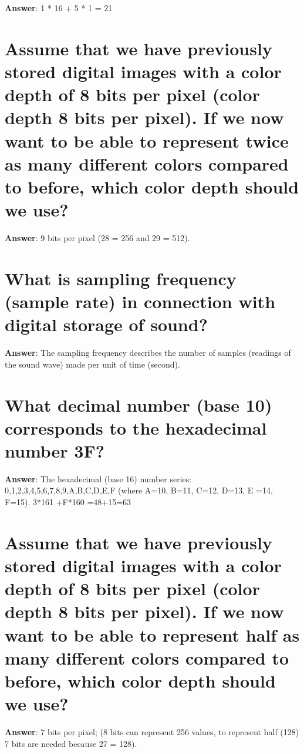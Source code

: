 \documentclass[a4paper,11pt,oneside]{book}
\begin{document}
\begin{sloppypar}
\textbf{Answer}: 1 * 16 + 5 * 1 = 21



\section{Assume that we have previously stored digital images with a color depth of 8 bits per pixel (color depth 8 bits per pixel). If we now want to be able to represent twice as many different colors compared to before, which color depth should we use?}

\label{q:76:sa:en:True}

\textbf{Answer}: 9 bits per pixel (28 = 256 and 29 = 512).



\section{What is sampling frequency (sample rate) in connection with digital storage of sound?}

\label{q:77:sa:en:True}

\textbf{Answer}: The sampling frequency describes the number of samples (readings of the sound wave) made per unit of time (second).



\section{What decimal number (base 10) corresponds to the hexadecimal number 3F?}

\label{q:78:sa:en:True}

\textbf{Answer}: The hexadecimal (base 16) number series: 0,1,2,3,4,5,6,7,8,9,A,B,C,D,E,F (where A=10, B=11, C=12, D=13, E =14, F=15). 3*161 +F*160 =48+15=63



\section{Assume that we have previously stored digital images with a color depth of 8 bits per pixel (color depth 8 bits per pixel). If we now want to be able to represent half as many different colors compared to before, which color depth should we use?}

\label{q:79:sa:en:True}

\textbf{Answer}: 7 bits per pixel; (8 bits can represent 256 values, to represent half (128) 7 bits are needed because 27 = 128).




\end{sloppypar}
\end{document}
